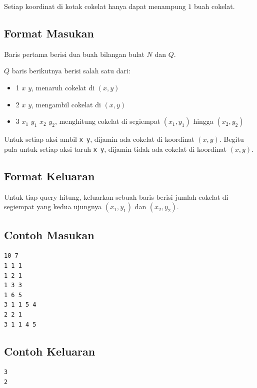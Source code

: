 \documentclass{article}
\begin{document}
\par\noindent Setiap koordinat di kotak cokelat hanya dapat menampung $1$ buah cokelat.

\subsection*{Format Masukan}

\par\noindent Baris pertama berisi dua buah bilangan bulat $N$ dan $Q$.
\par\noindent $Q$ baris berikutnya berisi salah satu dari:
\begin{itemize}
	\item 1 $x$ $y$, menaruh cokelat di $(x,y)$
	\item 2 $x$ $y$, mengambil cokelat di $(x,y)$
	\item 3 $x_{1}$ $y_{1}$ $x_{2}$ $y_{2}$, menghitung cokelat di segiempat $(x_1,y_1)$ hingga $(x_2,y_2)$
\end{itemize}
\par\noindent Untuk setiap aksi ambil \lstinline{x y}, dijamin ada cokelat di koordinat $(x,y)$. Begitu pula untuk setiap aksi taruh \lstinline{x y}, dijamin tidak ada cokelat di koordinat $(x,y)$.

\subsection*{Format Keluaran}

\par\noindent Untuk tiap query hitung, keluarkan sebuah baris berisi jumlah cokelat di segiempat yang kedua ujungnya $(x_1,y_1)$ dan $(x_2,y_2)$.

\subsection*{Contoh Masukan}

\begin{lstlisting}
10 7
1 1 1
1 2 1
1 3 3
1 6 5
3 1 1 5 4
2 2 1
3 1 1 4 5
\end{lstlisting}

\subsection*{Contoh Keluaran}

\begin{lstlisting}
3
2
\end{lstlisting}
\end{document}
